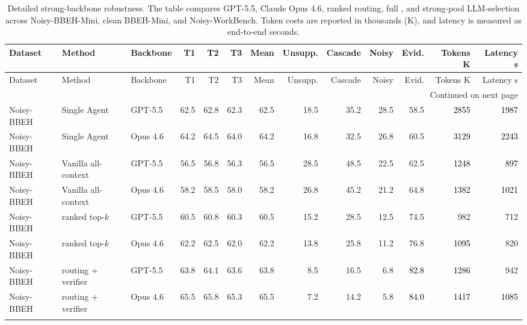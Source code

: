 ﻿\begingroup
\scriptsize
\setlength{\tabcolsep}{1.9pt}
\setlength{\LTleft}{\fill}
\setlength{\LTright}{\fill}
\begin{longtable}{lllrrrrrrrrrr}
\caption{Detailed strong-backbone robustness. The table compares GPT-5.5, Claude Opus 4.6, ranked routing, full \method{}, and strong-pool LLM-selection across Noisy-BBEH-Mini, clean BBEH-Mini, and Noisy-WorkBench. Token costs are reported in thousands (K), and latency is measured as end-to-end seconds.}\label{tab:strong-backbone-results-detailed}\\
\toprule
Dataset & Method & Backbone & T1 & T2 & T3 & Mean & Unsupp. & Cascade & Noisy & Evid. & Tokens K & Latency s \\
\midrule
\endfirsthead
\toprule
Dataset & Method & Backbone & T1 & T2 & T3 & Mean & Unsupp. & Cascade & Noisy & Evid. & Tokens K & Latency s \\
\midrule
\endhead
\midrule
\multicolumn{13}{r}{\scriptsize Continued on next page}\\
\endfoot
\bottomrule
\endlastfoot
Noisy-BBEH & Single Agent & GPT-5.5 & 62.5 & 62.8 & 62.3 & 62.5 & 18.5 & 35.2 & 28.5 & 58.5 & \textcolor{black}{2855} & \textcolor{black}{1987} \\
Noisy-BBEH & Single Agent & Opus 4.6 & 64.2 & 64.5 & 64.0 & 64.2 & 16.8 & 32.5 & 26.8 & 60.5 & \textcolor{black}{3129} & \textcolor{black}{2243} \\
Noisy-BBEH & Vanilla all-context & GPT-5.5 & 56.5 & 56.8 & 56.3 & 56.5 & 28.5 & 48.5 & 22.5 & 62.5 & \textcolor{black}{1248} & \textcolor{black}{897} \\
Noisy-BBEH & Vanilla all-context & Opus 4.6 & 58.2 & 58.5 & 58.0 & 58.2 & 26.8 & 45.2 & 21.2 & 64.8 & \textcolor{black}{1382} & \textcolor{black}{1021} \\
Noisy-BBEH & ranked top-$k$ & GPT-5.5 & 60.5 & 60.8 & 60.3 & 60.5 & 15.2 & 28.5 & 12.5 & 74.5 & 982 & 712 \\
Noisy-BBEH & ranked top-$k$ & Opus 4.6 & 62.2 & 62.5 & 62.0 & 62.2 & 13.8 & 25.8 & 11.2 & 76.8 & \textcolor{black}{1095} & 820 \\
Noisy-BBEH & \method{} routing + verifier & GPT-5.5 & 63.8 & 64.1 & 63.6 & 63.8 & 8.5 & 16.5 & 6.8 & \textcolor{black}{82.8} & \textcolor{black}{1286} & 942 \\
Noisy-BBEH & \method{} routing + verifier & Opus 4.6 & 65.5 & 65.8 & 65.3 & 65.5 & 7.2 & 14.2 & 5.8 & \textcolor{black}{84.0} & \textcolor{black}{1417} & \textcolor{black}{1085} \\
\rowcolor{tracesoft}

\end{longtable}
